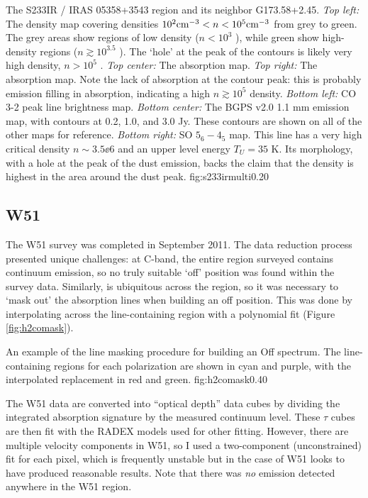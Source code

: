 {The S233IR / IRAS 05358+3543 region and its neighbor G173.58+2.45.
\textit{Top left:} The \formaldehyde density map covering densities
$10^2 \textrm{cm}^{-3}<n<10^5 \textrm{cm}^{-3}$ from grey to green.  The grey areas show
regions of low density ($n<10^3$ \percc), while green show high-density
regions ($n\gtrsim10^{3.5}$ \percc).  The `hole' at the peak of the contours
is likely very high density, $n>10^5$ \percc.
\textit{Top center: } The \formaldehyde \oneone absorption map.
\textit{Top right: } The \formaldehyde \twotwo absorption map.
Note the lack of absorption at the contour peak: this is probably \twotwo emission
filling in \twotwo absorption, indicating a high $n\gtrsim10^5$ \percc density.
\textit{Bottom left: } CO 3-2 peak line brightness map.
\textit{Bottom center: } The BGPS v2.0 1.1 mm emission map, with contours at 0.2, 1.0, and 3.0 Jy.
These contours are shown on all of the other maps for reference.
\textit{Bottom right: } SO $5_6-4_5$ map.  This line has a very high critical density $n\sim3.5\ee{6}$ \percc
and an upper level energy $T_U=35$ K.
Its morphology, with a hole at the peak of the dust emission, backs the claim that the density is highest
in the area around the dust peak.}
{fig:s233irmulti}{0.2}{0}


\subsection{W51}
The W51 survey was completed in September 2011.  The data reduction process
presented unique challenges: at C-band, the entire region surveyed contains
continuum emission, so no truly suitable `off' position was found within the
survey data.  Similarly, \formaldehyde is ubiquitous across the region, so it
was necessary to `mask out' the absorption lines when building an off position.
This was done by interpolating across the line-containing region with a
polynomial fit (Figure \ref{fig:h2comask}).  

{An example of the \formaldehyde line masking procedure for building an Off
spectrum.  The line-containing regions for each polarization are shown in cyan
and purple, with the interpolated replacement in red and green.
}{fig:h2comask}{0.4}{0}

The W51 data are converted into ``optical depth'' data cubes by dividing the
integrated \formaldehyde absorption signature by the measured continuum level.
These $\tau$ cubes are then fit with the RADEX models used for other
\formaldehyde fitting.  However, there are multiple velocity components in W51,
so I used a two-component (unconstrained) fit for each pixel, which is
frequently unstable but in the case of W51 looks to have produced reasonable
results.  Note that there was \emph{no} \formaldehyde emission detected anywhere
in the W51 region.

